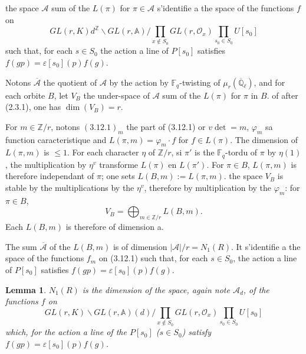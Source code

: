 \documentclass[11pt,a4paper]{article}
\theoremstyle{plain}
\newtheorem{lemma}[theorem]{Lemma}
\theoremstyle{definition}
\newcommand{\Z}{\mathbb{Z}}
\newcommand{\F}{\mathbb{F}}
\newcommand{\Ql}{\overline{\mathbb{Q}}_\ell}
\begin{document}
\subsection{}
the space $\mathcal{A}$ sum of the $L(\pi)$ for $\pi \in \mathcal{A}$ s'identifie a the space of the functions $f$ on
\begin{equation}
GL(r, K) d^\Z \backslash GL(r, \mathbb{A}) / \prod_{x \notin S_0} GL(r, \mathcal{O}_x) \prod_{s_0 \in S_0} U[s_0]
\tag{3.12.1}
\end{equation}
such that, for each $s \in S_0$ the action a line of $P[s_0]$ satisfies $f(gp) = \varepsilon[s_0](p) f(g)$.

Notons $\overline{\mathcal{A}}$ the quotient of $\mathcal{A}$ by the action by $\F_q$-twisting of $\mu_r(\Ql)$, and for each orbite $B$, let $V_B$ the under-space of $\mathcal{A}$ sum of the $L(\pi)$ for $\pi$ in $B$. of after (2.3.1), one has $\dim(V_B) = r$.

For $m \in \Z/r$, notons $(3.12.1)_m$ the part of (3.12.1) or $v \det = m$, $\varphi_m$ sa function caracteristique and $L(\pi, m) = \varphi_m \cdot f$ for $f \in L(\pi)$. The dimension of $L(\pi, m)$ is $\leq 1$. For each character $\eta$ of $\Z/r$, si $\pi'$ is the $\F_q$-tordu of $\pi$ by $\eta(1)$, the multiplication by $\eta^v$ transforme $L(\pi)$ en $L(\pi')$. For $\pi \in B$, $L(\pi, m)$ is therefore independant of $\pi$; one sets $L(B, m) := L(\pi, m)$. the space $V_B$ is stable by the multiplications by the $\eta^v$, therefore by multiplication by the $\varphi_m$: for $\pi \in B$,
\[
V_B = \bigoplus_{m \in \Z/r} L(B, m).
\]
Each $L(B, m)$ is therefore of dimension a.

The sum $\overline{\mathcal{A}}$ of the $L(B, m)$ is of dimension $|\mathcal{A}|/r = N_1(R)$. It s'identifie a the space of the functions $f_m$ on (3.12.1) such that, for each $s \in S_0$, the action a line of $P[s_0]$ satisfies $f(gp) = \varepsilon[s_0](p) f(g)$.

\begin{lemma}
$N_1(R)$ is the dimension of the space, again note $\mathcal{A}_d$, of the functions $f$ on
\begin{equation}
GL(r, K) \backslash GL(r, \mathbb{A})(d) / \prod_{x \notin S_0} GL(r, \mathcal{O}_x) \prod_{s_0 \in S_0} U[s_0]
\tag{3.12.2}
\end{equation}
which, for the action a line of the $P[s_0]$ ($s \in S_0$) satisfy $f(gp) = \varepsilon[s_0](p) f(g)$.
\end{lemma}
\end{document}
